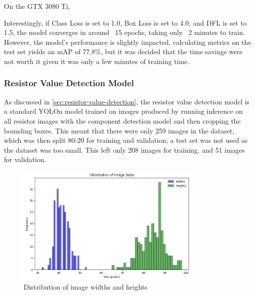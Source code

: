   
On the GTX 3080 Ti, 
  
Interestingly, if Class Loss is set to 1.0, Box Loss is set to 4.0, and DFL is set to 1.5, the model converges in around ~15 epochs, taking only ~2 minutes to train. However, the model's performance is slightly impacted, calculating metrics on the test set yields an mAP of 77.8\%, but it was decided that the time savings were not worth it given it was only a few minutes of training time.


\subsubsection{Resistor Value Detection Model}
As discussed in \autoref{sec:resistor-value-detection}, the resistor value detection model is a standard YOLOn model trained on images produced by running inference on all resistor images with the component detection model and then cropping the bounding boxes. This meant that there were only 259 images in the dataset, which was then split 80-20 for training and validation; a test set was not used as the dataset was too small. This left only 208 images for training, and 51 images for validation.

\begin{figure}[H]
  \centering
  \includegraphics[width=0.8\textwidth]{imgs/graphs/pixel_distrib.png}
  \caption{Distribution of image widths and heights}
  \label{fig:pixel-distrib}
\end{figure}

